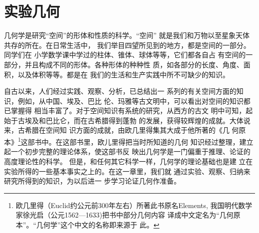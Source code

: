\chapter{实验几何}

几何学是研究“空间”的形体和性质的科学。“空间”
就是我们和万物以至星象天体共存的所在。在日常生活中，
我们举目四望所见到的地方，都是空间的一部分。同学们在
小学数学课中学过的柱体、锥体、球体等等，它们都各自占
有空间的一部分，并且构成不同的形体。各种形体的种种性
质，如各部分的长度、角度、面积，以及体积等等。都是在
我们的生活和生产实践中所不可缺少的知识。
\begin{figure}[htp]
	\centering
{}	
	\caption{}
\end{figure}

自古以来，人们经过实践、观察、分析，已总结出一
系列的有关空间方面的知识，例如，从中国、埃及、巴比
伦、玛雅等古文明中，可以看出对空间的知识都已掌握得
相当丰富了。对于空间知识有系统的研究，从西方的古文
明中可知，起始于古埃及和巴比仑，而在古希腊得到蓬勃
的发展，获得较辉煌的成就。大体说来，古希腊在空间知
识方面的成就，由欧几里得集其大成于他所著的《几
何原
本》\footnote{欧几里得（Euclid约公元前300年左右）所著此书原名Elements, 
	我国明代数学家徐光启（公元1562---1633)把书中部分几何内容
	译成中文定名为“几何原本”。“几何学”这个中文的名称即来源于
	此。}这部书中。在这部书里，欧儿里得把当时所知道的几何
知识经过整理，建立起一个初步完整的理论体系，使这部书反
映出几何学是一门偏重于推理、论证的高度理论性的科学。
但是，和任何其它科学一样，几何学的理论基础也是建
立在实验所得的一些基本事实之上的。在这一章里，我们就
通过实验、观察、归纳来研究所得到的知识，为以后进一
步学习论证几何作准备。

